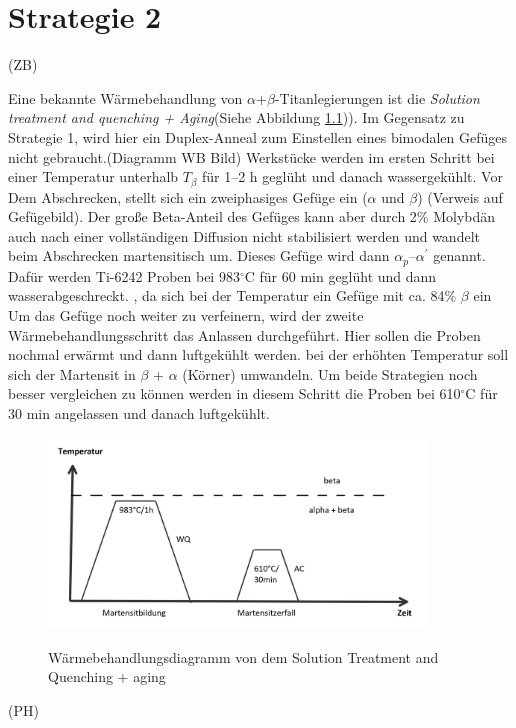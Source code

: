 \chapter{Strategie 2}

(ZB)

Eine bekannte Wärmebehandlung von $\alpha$+$\beta$-Titanlegierungen ist die  \textit{Solution treatment and quenching + Aging}(Siehe Abbildung \ref{fig:SQ})). Im Gegensatz zu  Strategie 1, wird hier ein Duplex-Anneal zum Einstellen eines bimodalen Gefüges nicht gebraucht.(Diagramm WB Bild)  Werkstücke werden im ersten Schritt bei einer Temperatur unterhalb $T_{\beta}$ für 1--2 h geglüht und danach wassergekühlt. Vor Dem Abschrecken, stellt sich ein zweiphasiges Gefüge ein ($\alpha$ und $\beta$) (Verweis auf Gefügebild). Der große Beta-Anteil des Gefüges kann aber durch 2\% Molybdän auch nach einer vollständigen Diffusion nicht stabilisiert werden und wandelt beim Abschrecken martensitisch um. Dieses Gefüge wird dann $\alpha_p$--$\alpha^\prime$ genannt.
Dafür werden Ti-6242 Proben bei 983$^\circ$C für 60 min geglüht und dann wasserabgeschreckt. , da sich bei der Temperatur ein Gefüge mit ca. 84\% $\beta$ ein
Um das Gefüge noch weiter zu verfeinern, wird der zweite Wärmebehandlungsschritt das Anlassen durchgeführt. Hier sollen die Proben nochmal erwärmt  und dann luftgekühlt werden. bei der erhöhten Temperatur soll sich der Martensit in $\beta$ + $\alpha$ (Körner) umwandeln.
Um beide Strategien noch besser vergleichen zu können werden in diesem Schritt  die Proben bei  610$^\circ$C  für 30 min angelassen und danach luftgekühlt.

\begin{figure}[H]
	\centering
	{\includegraphics[width=0.9\textwidth]{./Bilder/SQ.png}}
	\caption{Wärmebehandlungsdiagramm von dem Solution Treatment and Quenching + aging}
	\label{fig:SQ}
\end{figure}

(PH)

